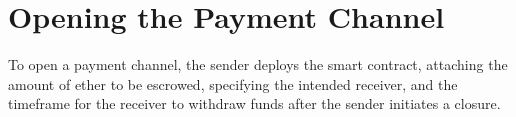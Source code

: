 \section{Opening the Payment Channel}\label{sec:opening-the-payment-channel}
To open a payment channel, the sender deploys the smart contract, attaching the amount of ether to be escrowed,
specifying the intended receiver, and the timeframe for the receiver to withdraw funds after the sender initiates a
closure.
